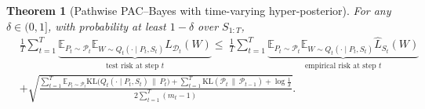 \documentclass{article}
\theoremstyle{plain}
\newtheorem{theorem}{Theorem}[section]
\theoremstyle{definition}
\theoremstyle{remark}
\begin{document}
\begin{theorem}[Pathwise PAC--Bayes with time-varying hyper-posterior]
\label{the: full}
For any $\delta\in(0,1]$, with probability at least $1-\delta$ over $S_{1:T}$,
\begin{equation}
\begin{aligned} 
& \frac{1}{T} \sum_{t=1}^T \underbrace{\mathbb{E}_{P_t \sim \mathcal{P}_t} \mathbb{E}_{W \sim Q_t(\cdot \mid P_t, S_t)} L_{\mathcal{D}_t}(W)}_{\text{test risk at step } t} 
\le \ \frac{1}{T} \sum_{t=1}^T \underbrace{\mathbb{E}_{P_t \sim \mathcal{P}_t} \mathbb{E}_{W \sim Q_t(\cdot \mid P_t, S_t)} \hat{L}_{S_t}(W)}_{\text{empirical risk at step } t} \\ 
& + \sqrt{\frac{ \sum_{t=1}^T \mathbb{E}_{P_t \sim \mathcal{P}_t} \mathrm{KL}\big(Q_t(\cdot \mid P_t, S_t) \,\|\, P_t\big) + \sum_{t=1}^T \mathrm{KL}(\mathcal{P}_t \,\|\, \mathcal{P}_{t-1}) + \log\frac{1}{\delta} }{2 \sum_{t=1}^T (m_t - 1)}}. 
\end{aligned} 
\end{equation}
\end{theorem}
\end{document}
